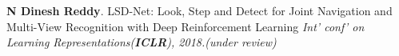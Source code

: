 \documentclass[a4paper,10pt]{article}
\begin{document}
 \textbf{N Dinesh Reddy}. LSD-Net: Look, Step and Detect for Joint Navigation and Multi-View Recognition with Deep Reinforcement Learning {\sl Int' conf' on Learning Representations(\textbf{ICLR}), 2018.(under review)}
 


 
 
\end{document}
